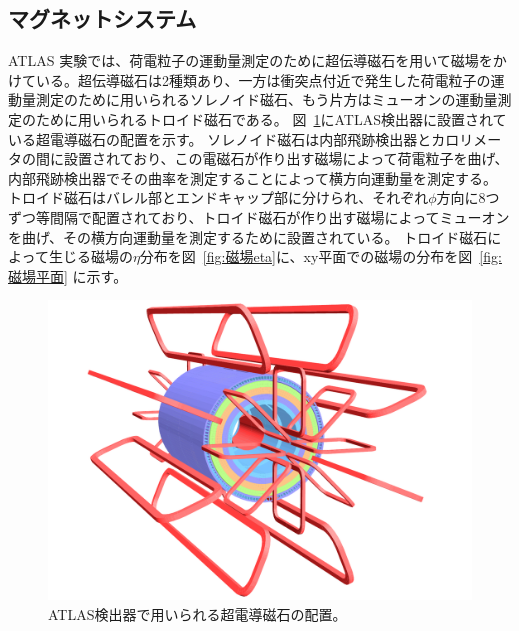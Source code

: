 \subsection{マグネットシステム}\label{magnetic_filed}
ATLAS 実験では、荷電粒子の運動量測定のために超伝導磁石を用いて磁場をかけている。超伝導磁石は2種類あり、一方は衝突点付近で発生した荷電粒子の運動量測定のために用いられるソレノイド磁石、もう片方はミューオンの運動量測定のために用いられるトロイド磁石である。
図~\ref{fig:磁石}にATLAS検出器に設置されている超電導磁石の配置を示す。
ソレノイド磁石は内部飛跡検出器とカロリメータの間に設置されており、この電磁石が作り出す磁場によって荷電粒子を曲げ、内部飛跡検出器でその曲率を測定することによって横方向運動量を測定する。
トロイド磁石はバレル部とエンドキャップ部に分けられ、それぞれ$\phi$方向に8つずつ等間隔で配置されており、トロイド磁石が作り出す磁場によってミューオンを曲げ、その横方向運動量を測定するために設置されている。
トロイド磁石によって生じる磁場の$\eta$分布を図~\ref{fig:磁場eta}に、xy平面での磁場の分布を図~\ref{fig:磁場平面} に示す。

\begin{figure}[tb]
  \centering
  \includegraphics[clip, width=14cm]{fig/2/ATLcoilGeom.pdf}
  \caption{ATLAS検出器で用いられる超電導磁石の配置\cite{Aad:1129811}。}
  \label{fig:磁石}
\end{figure}

